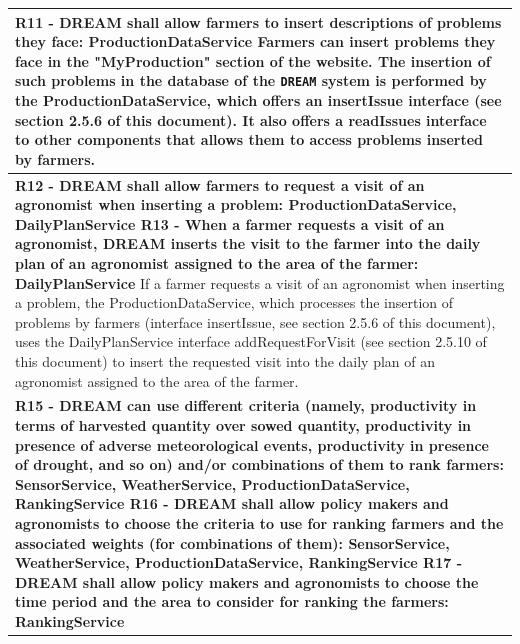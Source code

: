 \documentclass{article}
\begin{document}
\begin{longtable}[c]{|m{11.75cm}|}
    \textbf{R11 - DREAM shall allow farmers to insert descriptions of problems they face: ProductionDataService}
    \newline\newline
    Farmers can insert problems they face in the "MyProduction" section of the website. The insertion of such problems in the database of the \verb|DREAM| system is performed by the ProductionDataService, which offers an insertIssue interface (see section 2.5.6 of this document). It also offers a readIssues interface to other components that allows them to access problems inserted by farmers. \\
    \hline
    
    \textbf{R12 - DREAM shall allow farmers to request a visit of an agronomist when inserting a problem: ProductionDataService, DailyPlanService
    \newline\newline
    R13 - When a farmer requests a visit of an agronomist, DREAM inserts the visit to the farmer into the daily plan of an agronomist assigned to the area of the farmer: DailyPlanService}
    \newline\newline
    If a farmer requests a visit of an agronomist when inserting a problem, the ProductionDataService, which processes the insertion of problems by farmers (interface insertIssue, see section 2.5.6 of this document), uses the DailyPlanService interface addRequestForVisit (see section 2.5.10 of this document) to insert the requested visit into the daily plan of an agronomist assigned to the area of the farmer.\\
    \hline
    
    \textbf{R15 - DREAM can use different criteria (namely, productivity in terms of harvested quantity over sowed quantity, productivity in presence of adverse meteorological events, productivity in presence of drought, and so on) and/or combinations of them to rank farmers: SensorService, WeatherService, ProductionDataService, RankingService
    \newline \newline
    R16 - DREAM shall allow policy makers and agronomists to choose the criteria to use for ranking farmers and the associated weights (for combinations of them): SensorService, WeatherService, ProductionDataService, RankingService
    \newline\newline
    R17 - DREAM shall allow policy makers and agronomists to choose the time period and the area to consider for ranking the farmers: RankingService}
    \newline\newline
    

\end{longtable}
\end{document}
